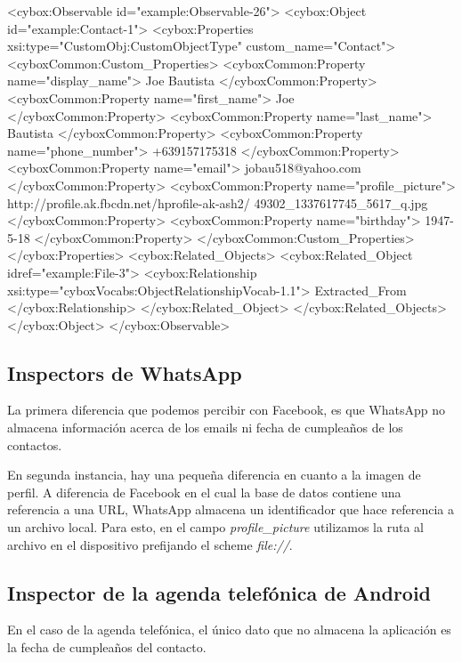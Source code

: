 \begin{xml}
<cybox:Observable id="example:Observable-26">
  <cybox:Object id="example:Contact-1">
    <cybox:Properties xsi:type="CustomObj:CustomObjectType" 
      custom_name="Contact">
      <cyboxCommon:Custom_Properties>
        <cyboxCommon:Property name="display_name">
          Joe Bautista
        </cyboxCommon:Property>
        <cyboxCommon:Property name="first_name">
          Joe
        </cyboxCommon:Property>
        <cyboxCommon:Property name="last_name">
          Bautista
        </cyboxCommon:Property>
        <cyboxCommon:Property name="phone_number">
          +639157175318
        </cyboxCommon:Property>
        <cyboxCommon:Property name="email">
          jobau518@yahoo.com
        </cyboxCommon:Property>
        <cyboxCommon:Property name="profile_picture">
          http://profile.ak.fbcdn.net/hprofile-ak-ash2/
            49302_1337617745_5617_q.jpg
        </cyboxCommon:Property>
        <cyboxCommon:Property name="birthday">
          1947-5-18
        </cyboxCommon:Property>
      </cyboxCommon:Custom_Properties>
    </cybox:Properties>
    <cybox:Related_Objects>
      <cybox:Related_Object idref="example:File-3">
        <cybox:Relationship 
          xsi:type="cyboxVocabs:ObjectRelationshipVocab-1.1">
          Extracted_From
        </cybox:Relationship>
      </cybox:Related_Object>
    </cybox:Related_Objects>
  </cybox:Object>
</cybox:Observable>
\end{xml}

\subsection{Inspectors de WhatsApp}
La primera diferencia que podemos percibir con Facebook, es que WhatsApp no almacena información acerca de los emails ni fecha de cumpleaños de los contactos.

En segunda instancia, hay una pequeña diferencia en cuanto a la imagen de perfil. A diferencia de Facebook en el cual la base de datos contiene una referencia a una URL, WhatsApp almacena un identificador que hace referencia a un archivo local. Para esto, en el campo \emph{profile\_picture} utilizamos la ruta al archivo en el dispositivo prefijando el scheme \emph{file://}.

\subsection{Inspector de la agenda telefónica de Android}
En el caso de la agenda telefónica, el único dato que no almacena la aplicación es la fecha de cumpleaños del contacto.

